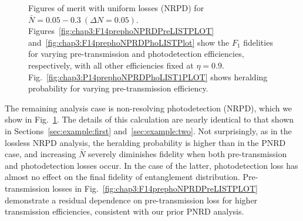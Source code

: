 \documentclass[aps,twocolumn,secnumarabic,amsmath,amssymb,pra,groupedaddress,
showpacs, showkeys,draft]{revtex4-1}
\newcommand{\pna}[1]{\left(#1\right)}
\begin{document}
\begin{figure}[ht]
\centering
{}
\caption{\label{fig:chap3:nrpd_lossy} Figures of merit with uniform losses (NRPD) for $\bar{N}=0.05-0.3~\pna{\Delta N = 0.05}$. Figures~\ref{fig:chap3:F14prephoNPRDPreLISTPLOT} and~\ref{fig:chap3:F14prephoNPRDPhoLISTPlot} show the $F_1$ fidelities for varying pre-transmission and photodetection efficiencies, respectively, with all other efficiencies fixed at $\eta=0.9$. Fig.~\ref{fig:chap3:P14prephoNPRDPhoLIST1PLOT} shows heralding probability for varying pre-transmission efficiency.}
\end{figure}

The remaining analysis case is non-resolving photodetection (NRPD), which we
show in Fig.~\ref{fig:chap3:nrpd_lossy}. The details of this calculation are
nearly identical to that shown in Sections~\ref{sec:example:first}
and~\ref{sec:example:two}. Not surprisingly, as in the lossless NRPD analysis,
the heralding probability is higher than in the PNRD case, and increasing
$\bar{N}$ severely diminishes fidelity when both pre-transmission and
photodetection losses occur. In the case of the latter, photodetection loss has
almost no effect on the final fidelity of entanglement
distribution. Pre-transmission losses in
Fig.~\ref{fig:chap3:F14prephoNPRDPreLISTPLOT} demonstrate a residual dependence
on pre-transmission loss for higher transmission efficiencies, consistent with
our prior PNRD analysis. 
\end{document}
